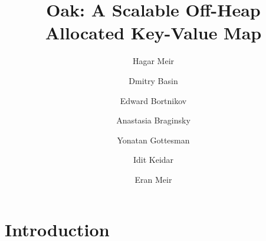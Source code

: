 \documentclass[sigplan,10pt,review,anonymous]{acmart}
\newcommand{\remove}[1]{}
\theoremstyle{definition}
\begin{document}
\title{Oak:  A Scalable Off-Heap Allocated Key-Value Map}

\author{Hagar Meir}

\author{Dmitry Basin}

\author{Edward Bortnikov}

\author{Anastasia Braginsky}

\author{Yonatan Gottesman}

\author{Idit Keidar}

\author{Eran Meir}

\begin{abstract}
 
\end{abstract}

\remove{
\begin{CCSXML}
<ccs2012>
<concept>
<concept_id>10003752.10003809.10010031</concept_id>
<concept_desc>Theory of computation~Data structures design and analysis</concept_desc>
<concept_significance>500</concept_significance>
</concept>
<concept>
<concept_id>10003752.10003809.10011778</concept_id>
<concept_desc>Theory of computation~Concurrent algorithms</concept_desc>
<concept_significance>500</concept_significance>
</concept>
</ccs2012>
\end{CCSXML}

\ccsdesc[500]{Theory of computation~Data structures design and analysis}
\ccsdesc[500]{Theory of computation~Concurrent algorithms}

\keywords{memory management, concurrent data structures, key-value maps}  %
}

 \maketitle


   \section{Introduction}
   
\end{document}

